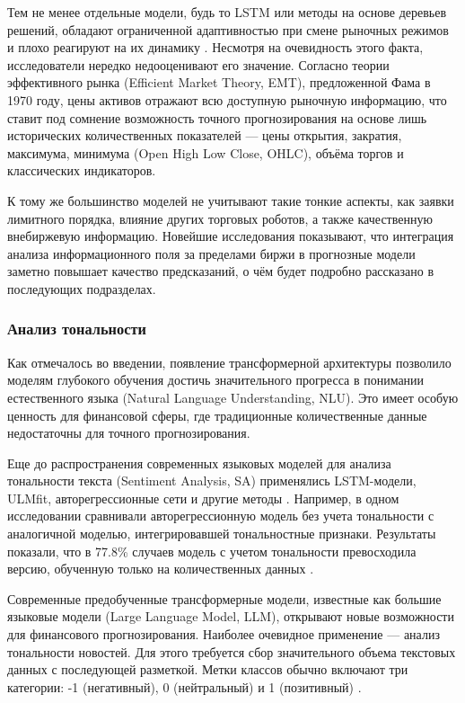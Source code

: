 Тем не менее отдельные модели, будь то LSTM или методы на основе деревьев решений, обладают ограниченной
адаптивностью при смене рыночных режимов и плохо реагируют на их динамику \parencite{Vukovi2024}.
Несмотря на очевидность этого факта, исследователи нередко недооценивают его значение. Согласно теории
эффективного рынка (Efficient Market Theory, EMT), предложенной Фама в 1970 году, цены активов отражают
всю доступную рыночную информацию, что ставит под сомнение возможность точного прогнозирования на основе
лишь исторических количественных показателей --- цены открытия, закратия, максимума, минимума (Open High
Low Close, OHLC), объёма торгов и классических индикаторов.

К тому же большинство моделей не учитывают такие тонкие аспекты, как заявки лимитного порядка, влияние
других торговых роботов, а также качественную внебиржевую информацию. Новейшие исследования показывают,
что интеграция анализа информационного поля за пределами биржи в прогнозные модели заметно повышает качество
предсказаний, о чём будет подробно рассказано в последующих подразделах.

\subsubsection{Анализ тональности}
Как отмечалось во введении, появление трансформерной архитектуры позволило моделям глубокого обучения
достичь значительного прогресса в понимании естественного языка (Natural Language Understanding, NLU).
Это имеет особую ценность для финансовой сферы, где традиционные количественные данные недостаточны
для точного прогнозирования.

Еще до распространения современных языковых моделей для анализа тональности текста (Sentiment Analysis,
SA) применялись LSTM-модели, ULMfit, авторегрессионные сети и другие методы
\parencite{Hochreiter1997LSTM, howard2018ULMFIT}. Например, в одном исследовании сравнивали
авторегрессионную модель без учета тональности с аналогичной моделью, интегрировавшей
тональностные признаки. Результаты показали, что в 77.8\% случаев модель с учетом тональности
превосходила версию, обученную только на количественных данных \parencite{NNAR2019}.

Современные предобученные трансформерные модели, известные как большие языковые модели (Large Language Model,
LLM), открывают новые возможности для финансового прогнозирования. Наиболее очевидное применение ---
анализ тональности новостей. Для этого требуется сбор значительного объема текстовых данных с последующей
разметкой. Метки классов обычно включают три категории: -1 (негативный), 0 (нейтральный) и 1 (позитивный)
\parencite{SA2020taxonomy}.

